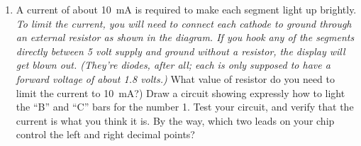 \begin{enumerate}[wide]
\begin{center}
\end{center}
  
\item A current of about 10~mA is required to make each segment light up brightly.  \textit{To limit the current, you will need to connect each cathode to ground through an external resistor as shown in the diagram.  If you hook any of the segments directly between 5 volt supply and ground without a resistor, the display will get blown out.  (They're diodes, after all; each is only supposed to have a forward voltage of about 1.8 volts.)}  What value of resistor do you need to limit the current to 10~mA?)  Draw a circuit showing expressly how to light the ``B'' and ``C'' bars for the number 1.  Test your circuit, and verify that the current is what you think it is.  By the way, which two leads on your chip control the left and right decimal points? \label{part_man72_connections}

\end{enumerate}

